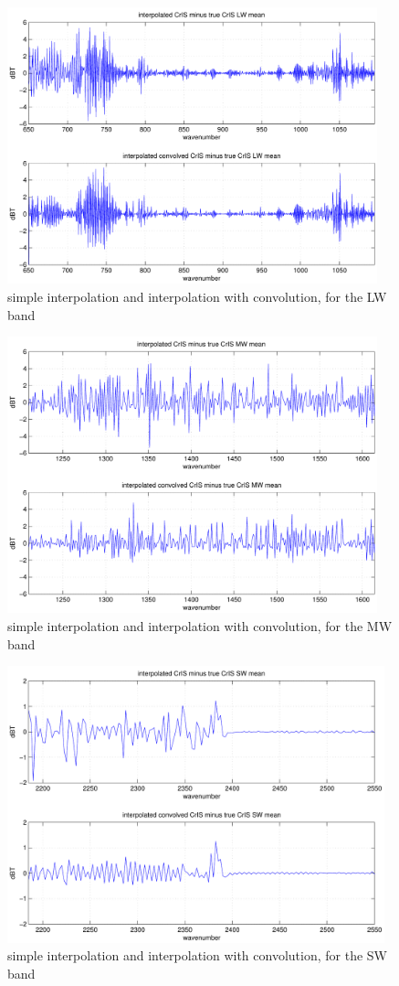 \documentclass[12pt]{article}
\begin{document}
\begin{figure}
  \centering
  \includegraphics[height=8cm]{figures/airs_cris_intp_LW.pdf}
  \caption{simple interpolation and interpolation with convolution, 
    for the {\cris} LW band}
  \label{intpLW}
\end{figure}

\begin{figure}
  \centering
  \includegraphics[height=8cm]{figures/airs_cris_intp_MW.pdf}
  \caption{simple interpolation and interpolation with convolution, 
    for the {\cris} MW band}
  \label{intpMW}
\end{figure}

\begin{figure}
  \centering
  \includegraphics[height=8cm]{figures/airs_cris_intp_SW.pdf}
  \caption{simple interpolation and interpolation with convolution, 
    for the {\cris} SW band}
  \label{intpSW}
\end{figure}
\end{document}
